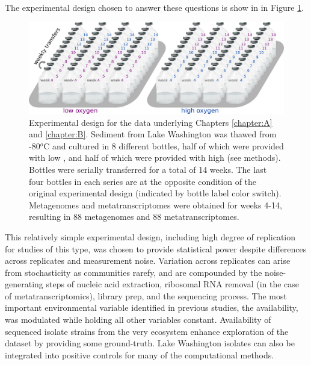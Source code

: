 The experimental design chosen to answer these questions is show in in Figure \ref{fig:experimental_design}.

\begin{figure}[H]
\centering
    \includegraphics[width=1.0\textwidth]{./tex/chapter2/figures/170311_experimental_design_meta4--2_colors.png}
    \begin{singlespace}
    \caption[Experimental design for the data underlying Chapters \ref{chapter:A} and \ref{chapter:B}]{
	Experimental design for the data underlying Chapters \ref{chapter:A} and \ref{chapter:B}.
	Sediment from Lake Washington was thawed from -80$^o$C and cultured in 8 different bottles,
        half of which were provided with low , and half of which were provided with high  (see methods).
	   Bottles were serially transferred for a total of 14 weeks.
	   The last four bottles in each series are at the opposite  condition of the original experimental design
        (indicated by bottle label color switch).
	   Metagenomes and metatranscriptomes were obtained for weeks 4-14, resulting in 88 metagenomes and 88 metatranscriptomes.
	   }
    \label{fig:experimental_design}
    \end{singlespace}
\end{figure}

This relatively simple experimental design, including high degree of replication for studies of this type, was chosen to provide statistical power despite differences across replicates and measurement noise.
Variation across replicates can arise from stochasticity as communities rarefy, and are compounded by the noise-generating steps of nucleic acid extraction, ribosomal RNA removal (in the case of metatranscriptomics), library prep, and the sequencing process.
The most important environmental variable identified in previous studies, the  availability, was modulated while holding all other variables constant.
Availability of sequenced isolate strains from the very ecosystem enhance exploration of the dataset by providing some ground-truth.
Lake Washington isolates can also be integrated into positive controls for many of the computational methods.

